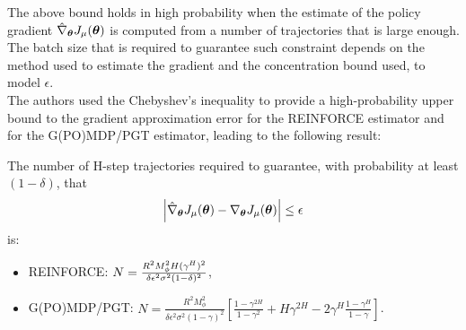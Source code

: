 The above bound holds in high probability when the estimate of the policy gradient $\hat{\nabla}_{{\boldsymbol{\theta}}}J_\mu({\boldsymbol{\theta}})$ is computed from a number of trajectories that is large enough. The batch size that is required to guarantee such constraint depends on the method used to estimate the gradient and the concentration bound used, to model $\epsilon$.\\
The authors used the Chebyshev's inequality to provide a high-probability upper bound to the gradient approximation error for the REINFORCE estimator and for the G(PO)MDP/PGT estimator, leading to the following result:
\begin{corollary}
The number of H-step trajectories required to guarantee, with probability at least $(1-\delta)$, that 
\[
\left| \hat{\nabla}_{{\boldsymbol{\theta}}}J_\mu({\boldsymbol{\theta}}) - \nabla_{{\boldsymbol{\theta}}}J_\mu({\boldsymbol{\theta}}) \right|\leq \epsilon
\]
is:
\begin{itemize}
\item REINFORCE: $N=\frac{R^2M_\phi^2 H(\-\gamma^H)^2}{\delta\epsilon^2\sigma^2(1-\delta)^2}$,
\item G(PO)MDP/PGT: $N=\frac{R^2M_\phi^2}{\delta\epsilon^2\sigma^2(1-\gamma)^2}\left[ \frac{1-\gamma^{2H}}{1-\gamma^2} + H\gamma^{2H} - 2 \gamma^H\frac{1-\gamma^H}{1-\gamma} \right]$.
\end{itemize}
\end{corollary}


